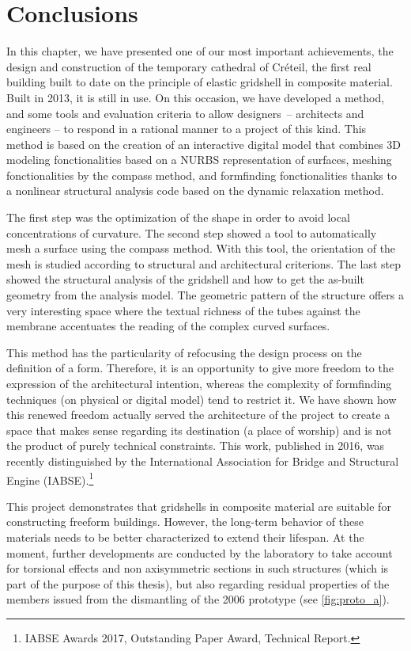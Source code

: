
\section{Conclusions}

In this chapter, we have presented one of our most important achievements, the design and construction of the temporary cathedral of Créteil, the first real building built to date on the principle of elastic gridshell in composite material. Built in 2013, it is still in use. On this occasion, we have developed a method, and some tools and evaluation criteria to allow designers~-- architects and engineers -- to respond in a rational manner to a project of this kind. This method is based on the creation of an interactive digital model that combines 3D modeling fonctionalities based on a NURBS representation of surfaces, meshing fonctionalities by the compass method, and formfinding fonctionalities thanks to a nonlinear structural analysis code based on the dynamic relaxation method.

The first step was the optimization of the shape in order to avoid local concentrations of curvature. The second step showed a tool to automatically mesh a surface using the compass method. With this tool, the orientation of the mesh is studied according to structural and architectural criterions. The last step showed the structural analysis of the gridshell and how to get the as-built geometry from the analysis model. The geometric pattern of the structure offers a very interesting space where the textual richness of the tubes against the membrane accentuates the reading of the complex curved surfaces.


This method has the particularity of refocusing the design process on the definition of a form. Therefore, it is an opportunity to give more freedom to the expression of the architectural intention, whereas the complexity of formfinding techniques (on physical or digital model) tend to restrict it. We have shown how this renewed freedom actually served the architecture of the project to create a space that makes sense regarding its destination (a place of worship) and is not the product of purely technical constraints. This work, published in 2016, was recently distinguished by the International Association for Bridge and Structural Engine (IABSE).\footnote {IABSE Awards 2017, Outstanding Paper Award, Technical Report.}

This project demonstrates that gridshells in composite material are suitable for constructing freeform buildings. However, the long-term behavior of these materials needs to be better characterized to extend their lifespan. At the moment, further developments are conducted by the laboratory to take account for torsional effects and non axisymmetric sections in such structures (which is part of the purpose of this thesis), but also regarding residual properties of the members issued from the dismantling of the 2006 prototype \cite{Douthe2017} (see \cref{fig:proto_a}).

